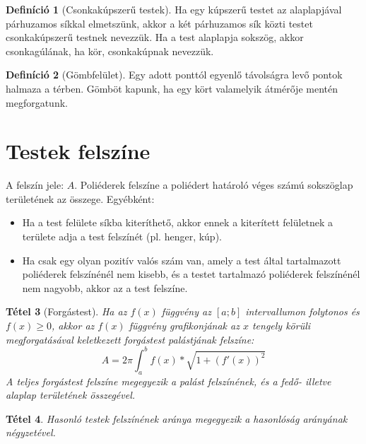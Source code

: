 \documentclass[twoside,12pt]{report}
\newtheorem{theorem}{Tétel}[section]
\theoremstyle{definition}
\newtheorem{definition}[theorem]{Definíció}
\begin{document}
	\begin{definition}[Csonkakúpszerű testek]
		Ha egy kúpszerű testet az alaplapjával párhuzamos síkkal elmetszünk, akkor a két párhuzamos sík közti testet csonkakúpszerű testnek nevezzük. Ha a test alaplapja sokszög, akkor csonkagúlának, ha kör, csonkakúpnak nevezzük.
	\end{definition}
	\begin{definition}[Gömbfelület]
		Egy adott ponttól egyenlő távolságra levő pontok halmaza a térben. Gömböt kapunk, ha egy kört valamelyik átmérője mentén megforgatunk.
	\end{definition}
\section{Testek felszíne}
	A felszín jele: $A$. Poliéderek felszíne a poliédert határoló véges számú sokszöglap területének az összege. Egyébként:
	\begin{itemize}
		\item Ha a test felülete síkba kiteríthető, akkor ennek a kiterített felületnek a területe adja a test felszínét (pl. henger, kúp).
		\item Ha csak egy olyan pozitív valós szám van, amely a test által tartalmazott poliéderek felszínénél nem kisebb, és a testet tartalmazó poliéderek felszínénél nem nagyobb, akkor az a test felszíne.
	\end{itemize}
	\begin{theorem}[Forgástest]
		Ha az $f(x)$ függvény az $[a;b]$ intervallumon folytonos és $f(x)\ge0$, akkor az $f(x)$ függvény grafikonjának az $x$ tengely körüli megforgatásával keletkezett forgástest palástjának felszíne:
		\begin{equation*}
			A=2\pi\int_{a}^{b}f(x)*\sqrt{1+\left(f'(x)\right)^2}
		\end{equation*}
		A teljes forgástest felszíne megegyezik a palást felszínének, és a fedő- illetve alaplap területének összegével.
	\end{theorem}
	\begin{theorem}
		Hasonló testek felszínének aránya megegyezik a hasonlóság arányának négyzetével.
	\end{theorem}
\end{document}
